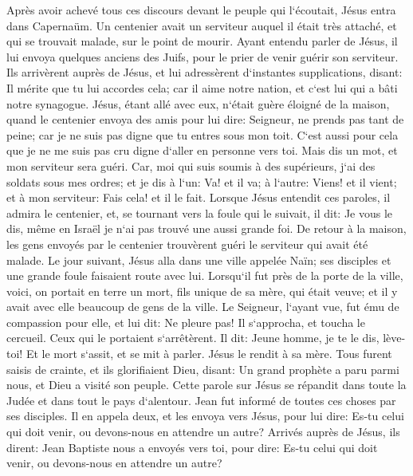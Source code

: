 \verse Après avoir achevé tous ces discours devant le peuple qui l`écoutait, Jésus entra dans Capernaüm. 
\verse Un centenier avait un serviteur auquel il était très attaché, et qui se trouvait malade, sur le point de mourir. 
\verse Ayant entendu parler de Jésus, il lui envoya quelques anciens des Juifs, pour le prier de venir guérir son serviteur. 
\verse Ils arrivèrent auprès de Jésus, et lui adressèrent d`instantes supplications, disant: Il mérite que tu lui accordes cela; 
\verse car il aime notre nation, et c`est lui qui a bâti notre synagogue. 
\verse Jésus, étant allé avec eux, n`était guère éloigné de la maison, quand le centenier envoya des amis pour lui dire: Seigneur, ne prends pas tant de peine; car je ne suis pas digne que tu entres sous mon toit. 
\verse C`est aussi pour cela que je ne me suis pas cru digne d`aller en personne vers toi. Mais dis un mot, et mon serviteur sera guéri. 
\verse Car, moi qui suis soumis à des supérieurs, j`ai des soldats sous mes ordres; et je dis à l`un: Va! et il va; à l`autre: Viens! et il vient; et à mon serviteur: Fais cela! et il le fait. 
\verse Lorsque Jésus entendit ces paroles, il admira le centenier, et, se tournant vers la foule qui le suivait, il dit: Je vous le dis, même en Israël je n`ai pas trouvé une aussi grande foi. 
\verse De retour à la maison, les gens envoyés par le centenier trouvèrent guéri le serviteur qui avait été malade. 
\verse Le jour suivant, Jésus alla dans une ville appelée Naïn; ses disciples et une grande foule faisaient route avec lui. 
\verse Lorsqu`il fut près de la porte de la ville, voici, on portait en terre un mort, fils unique de sa mère, qui était veuve; et il y avait avec elle beaucoup de gens de la ville. 
\verse Le Seigneur, l`ayant vue, fut ému de compassion pour elle, et lui dit: Ne pleure pas! 
\verse Il s`approcha, et toucha le cercueil. Ceux qui le portaient s`arrêtèrent. Il dit: Jeune homme, je te le dis, lève-toi! 
\verse Et le mort s`assit, et se mit à parler. Jésus le rendit à sa mère. 
\verse Tous furent saisis de crainte, et ils glorifiaient Dieu, disant: Un grand prophète a paru parmi nous, et Dieu a visité son peuple. 
\verse Cette parole sur Jésus se répandit dans toute la Judée et dans tout le pays d`alentour. 
\verse Jean fut informé de toutes ces choses par ses disciples. 
\verse Il en appela deux, et les envoya vers Jésus, pour lui dire: Es-tu celui qui doit venir, ou devons-nous en attendre un autre? 
\verse Arrivés auprès de Jésus, ils dirent: Jean Baptiste nous a envoyés vers toi, pour dire: Es-tu celui qui doit venir, ou devons-nous en attendre un autre? 
